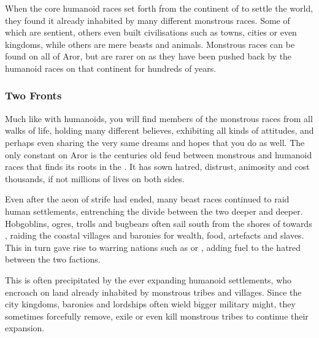 When the core humanoid races set forth from the continent
of  to settle the world, they found it already inhabited
by many different monstrous races. Some of which are sentient, others even
built civilisations such as towns, cities or even kingdoms, while others are
mere beasts and animals. Monstrous races can be found on all of Aror, but are
rarer on  as they have been pushed back by the
humanoid races on that continent for hundreds of years.

\subsubsection{Two Fronts}

Much like with humanoids, you will find members of the monstrous races from
all walks of life, holding many different believes, exhibiting all kinds of
attitudes, and perhaps even sharing the very same dreams and hopes that you do
as well. The only constant on Aror is the centuries old feud between monstrous
and humanoid races that finds its roots in the . It has sown hatred, distrust, animosity and cost thousands, if not
millions of lives on both sides.

Even after the aeon of strife had ended, many beast races continued to raid
human settlements, entrenching the divide between the two deeper and deeper.
Hobgoblins, ogres, trolls and bugbears often sail south from the shores of
 towards , raiding the coastal
villages and baronies for wealth, food, artefacts and slaves. This in turn
gave rise to warring nations such as  or
, adding fuel to the hatred between the two factions.

This is often precipitated by the ever expanding humanoid settlements, who
encroach on land already inhabited by monstrous tribes and villages. Since the
city kingdoms, baronies and lordships often wield bigger military might, they
sometimes forcefully remove, exile or even kill monstrous tribes to continue
their expansion.










